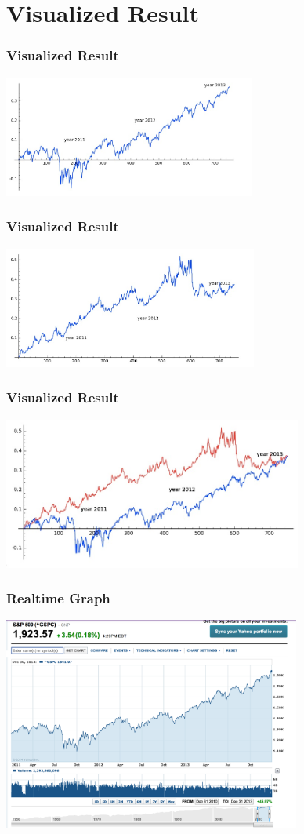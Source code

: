 \documentclass[mathserif]{beamer}
\begin{document}
\section{Visualized Result}
\begin{frame}
\frametitle{Visualized Result}
    \includegraphics[height=4cm]{1.jpg}
\end{frame}

\begin{frame}
\frametitle{Visualized Result}
    \includegraphics[height=4cm]{2.jpg}
\end{frame}

\begin{frame}
\frametitle{Visualized Result}
    \includegraphics[height=5cm]{3.jpg}   
\end{frame}

\begin{frame}
\frametitle{Realtime Graph}
    \includegraphics[height=7cm]{4.png}   
\end{frame}
\end{document}
